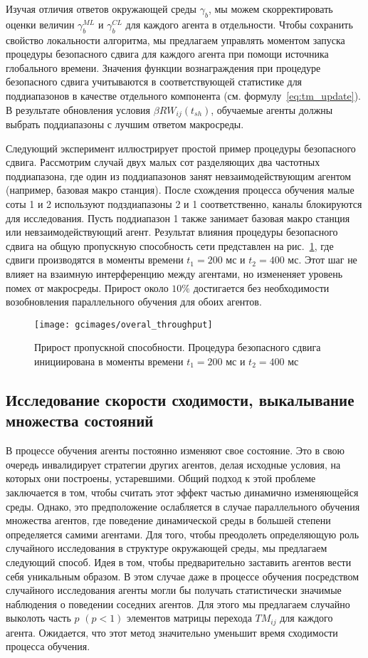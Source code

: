 Изучая отличия ответов окружающей среды $\gamma_b$, мы можем скорректировать оценки величин $\gamma_b^{ML}$ и $\gamma_b^{CL}$ для каждого агента в отдельности. Чтобы сохранить свойство локальности алгоритма, мы предлагаем управлять моментом запуска процедуры безопасного сдвига для каждого агента при помощи источника глобального времени. Значения функции вознаграждения при процедуре безопасного сдвига учитываются в соответствующей статистике для поддиапазонов в качестве отдельного компонента (см. формулу~\ref{eq:tm_update}). В результате обновления условия $\beta RW_{ij}(t_{sh})$, обучаемые агенты должны выбрать поддиапазоны с лучшим ответом макросреды.

Следующий эксперимент иллюстрирует простой пример процедуры безопасного сдвига. Рассмотрим случай двух малых сот разделяющих два частотных поддиапазона, где один из поддиапазонов занят невзаимодействующим агентом (например, базовая макро станция). После схождения процесса обучения малые соты 1 и 2 используют подздиапазоны 2 и 1 соответственно, каналы блокируются для исследования. Пусть поддиапазон 1 также занимает базовая макро станция или невзаимодействующий агент. Результат влияния процедуры безопасного сдвига на общую пропускную способность сети представлен на рис.~\ref{fig:safe_shift_overal_throughput}, где сдвиги производятся в моменты времени $t_1=200$ мс и $t_2=400$ мс. Этот шаг не влияет на взаимную интерференцию между агентами, но измененяет уровень помех от макросреды. Прирост около $10\%$ достигается без необходимости возобновления параллельного обучения для обоих агентов.

\begin{figure}
    \centering
    \texttt{[image: gcimages/overal\_throughput]}
    \caption{Прирост пропускной способности. Процедура безопасного сдвига инициирована в моменты времени $t_1=200$ мс и $t_2=400$ мс }
    \label{fig:safe_shift_overal_throughput}
\end{figure}

\subsection{Исследование скорости сходимости, выкалывание множества состояний}
В процессе обучения агенты постоянно изменяют свое состояние. Это в свою очередь инвалидирует стратегии других агентов, делая исходные условия, на которых они построены, устаревшими. Общий подход к этой проблеме заключается в том, чтобы считать этот эффект частью динамично изменяющейся среды. Однако, это предположение ослабляется в случае параллельного обучения множества агентов, где поведение динамической среды в большей степени определяется самими агентами.
Для того, чтобы преодолеть определяющую роль случайного исследования в структуре окружающей среды, мы предлагаем следующий способ. Идея в том, чтобы предварительно заставить агентов вести себя уникальным образом. В этом случае даже в процессе обучения посредством случайного исследования агенты могли бы получать статистически значимые наблюдения о поведении соседних агентов. Для этого мы предлагаем случайно выколоть часть $p$ $(p< 1)$ элементов матрицы перехода $TM_{ij}$ для каждого агента. Ожидается, что этот метод значительно уменьшит время сходимости процесса обучения.


